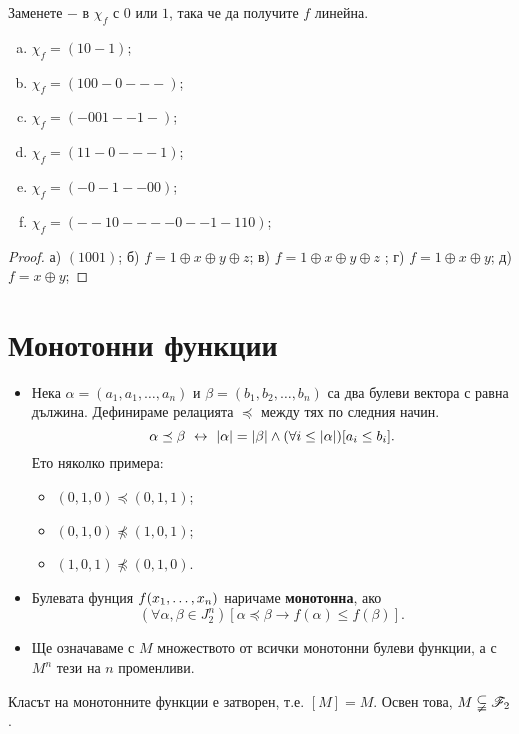 \begin{problem}
  Заменете $-$ в $\chi_f$ с $0$ или $1$, така че да получите $f$ линейна.
  \begin{enumerate}[a)]
  \item
    $\chi_f = (10-1)$;
  \item
    $\chi_f = (100-0---)$;
  \item
    $\chi_f = (-001--1-)$;
  \item
    $\chi_f = (11-0---1)$;
  \item
    $\chi_f = (-0-1--00)$;
  \item
    $\chi_f = (--10----0--1-110)$;
  \end{enumerate}
\end{problem}
\begin{proof}
  а) $(1001)$; б) $f = 1\oplus x \oplus y\oplus z$; в) $f = 1\oplus x\oplus y\oplus z$ ;
  г) $f = 1\oplus x\oplus y$; д) $f = x\oplus y$;
\end{proof}


\section{Монотонни функции}
\begin{itemize}
\item 
  Нека $\alpha = (a_1,a_1,\dots,a_n)$ и $\beta = (b_1,b_2,\dots,b_n)$ са два булеви вектора с равна дължина.
  Дефинираме релацията $\preceq$ между тях по следния начин.
  \[\alpha \preceq \beta \ \leftrightarrow\  \lvert{\alpha}\rvert = \lvert{\beta}\rvert\wedge (\forall i \leq \lvert{\alpha}\rvert)[a_i \leq b_i].\]
  Ето няколко примера:
  \begin{itemize}
  \item 
    $(0,1,0) \preceq (0,1,1)$;
  \item
    $(0,1,0) \not\preceq (1,0,1)$;
  \item
    $(1,0,1) \not\preceq (0,1,0)$.
  \end{itemize}
\item
  Булевата фунция $f(x_{1},\dots,x_{n})$ наричаме {\bf монотонна}, ако 
  \[(\forall \alpha,\beta\in J^n_2 )[\alpha\preceq\beta \rightarrow f(\alpha) \leq f(\beta)].\]  
\item
  Ще означаваме с $M$ множеството от всички монотонни булеви функции, а с $M^n$ тези на $n$ променливи.
\end{itemize}

\begin{prop}
  Класът на монотонните функции е затворен, т.е. $[M] = M$.
  Освен това, $M \subsetneqq \mathscr{F}_2$.
\end{prop}


